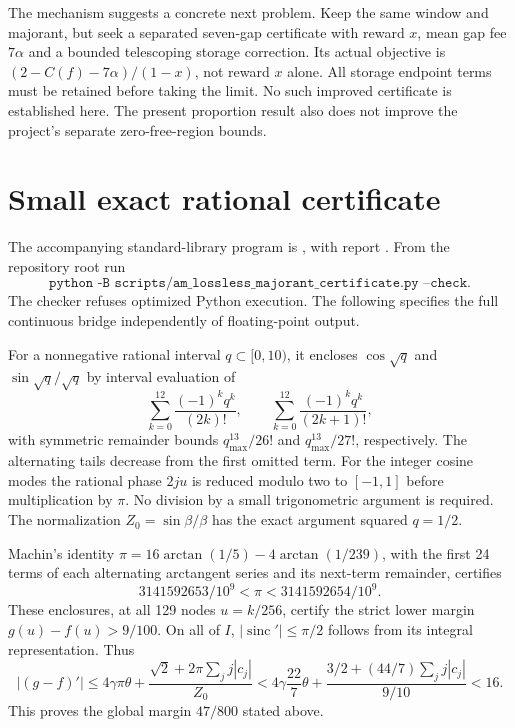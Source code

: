 \documentclass[11pt,a4paper]{article}
\theoremstyle{remark}
\DeclareMathOperator{\sinc}{sinc}
\begin{document}
The mechanism suggests a concrete next problem. Keep the same
window and majorant, but seek a separated seven-gap certificate
with reward $x$, mean gap fee $7\alpha$ and a bounded telescoping
storage correction. Its actual objective is
$(2-C(f)-7\alpha)/(1-x)$, not reward $x$ alone.
All storage endpoint terms must be retained before taking the
limit. No such improved certificate is established here.
The present proportion result also does not improve the project's
separate zero-free-region bounds.

\appendix
\section{Small exact rational certificate}\label{app:certificate}

The accompanying standard-library program is
{\small{}}, with report
{\small{}}.
From the repository root run
\[
 \texttt{python -B scripts/am\_lossless\_majorant\_certificate.py --check}.
\]
The checker refuses optimized Python execution.
The following specifies the full continuous bridge independently
of floating-point output.

For a nonnegative rational interval $q\subset[0,10)$, it encloses
$\cos\sqrt q$ and $\sin\sqrt q/\sqrt q$ by interval evaluation of
\[
 \sum_{k=0}^{12}\frac{(-1)^kq^k}{(2k)!},
 \qquad
 \sum_{k=0}^{12}\frac{(-1)^kq^k}{(2k+1)!},
\]
with symmetric remainder bounds
$q_{\max}^{13}/26!$ and $q_{\max}^{13}/27!$, respectively.
The alternating tails decrease from the first omitted term.
For the integer cosine modes the rational phase $2ju$ is
reduced modulo two to $[-1,1]$ before multiplication by $\pi$.
No division by a small trigonometric argument is required.
The normalization $Z_0=\sin\beta/\beta$ has the exact argument
squared $q=1/2$.

Machin's identity
$\pi=16\arctan(1/5)-4\arctan(1/239)$, with the first 24 terms
of each alternating arctangent series and its next-term remainder,
certifies
\[
 3141592653/10^9<\pi<3141592654/10^9.
\]
These enclosures, at all 129 nodes $u=k/256$, certify the strict
lower margin $g(u)-f(u)>9/100$.
On all of $I$, $|\sinc'|\le\pi/2$ follows from its integral
representation. Thus
\[
 |(g-f)'|\le4\gamma\pi\theta+
       \frac{\sqrt2+2\pi\sum_jj|c_j|}{Z_0}
 <4\gamma\frac{22}{7}\theta+
       \frac{3/2+(44/7)\sum_jj|c_j|}{9/10}<16.
\]
This proves the global margin $47/800$ stated above.
\end{document}
